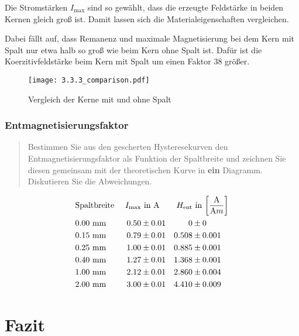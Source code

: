 \documentclass[12pt,a4paper]{scrartcl}
\numberwithin{equation}{section} %
\renewcommand{\[}{} %
\renewcommand{\]}{\noindent} %
\begin{document}
Die Stromstärken \(I_\mathrm{max}\) sind so gewählt, dass die erzeugte
Feldstärke in beiden Kernen gleich groß ist. Damit lassen sich die
Materialeigenschaften vergleichen.

Dabei fällt auf, dass Remanenz und maximale Magnetisierung bei dem Kern
mit Spalt nur etwa halb so groß wie beim Kern ohne Spalt ist. Dafür ist
die Koerzitivfeldstärke beim Kern mit Spalt um einen Faktor \(38\)
größer.

\begin{figure}
\centering
\texttt{[image: 3.3.3\_comparison.pdf]}
\caption{Vergleich der Kerne mit und ohne Spalt}
\end{figure}

\hypertarget{entmagnetisierungsfaktor-1}{%
\subsubsection{Entmagnetisierungsfaktor}\label{entmagnetisierungsfaktor-1}}

\begin{quote}
Bestimmen Sie aus den gescherten Hysteresekurven den
Entmagnetisierungsfaktor als Funktion der Spaltbreite und zeichnen Sie
diesen gemeinsam mit der theoretischen Kurve in \textbf{ein} Diagramm.
Diskutieren Sie die Abweichungen.
\end{quote}

\[
\begin{align*}
    &\text{Spaltbreite } &
        I_\mathrm{max} &\text{ in } \mathrm A &
        H_\mathrm{ent} &\text{ in }
            {\tiny \left[ \frac{\mathrm A}{\mathrm Am} \right] }
        \\
    &0.00 \ \mathrm{mm} &
        0.50 &\pm 0.01 &
        0 &\pm 0
        \\
    &0.15 \ \mathrm{mm} &
        0.79 &\pm 0.01 &
        0.508 &\pm 0.001
        \\
    &0.25 \ \mathrm{mm} &
        1.00 &\pm 0.01 &
        0.885 &\pm 0.001
        \\
    &0.40 \ \mathrm{mm} &
        1.27 &\pm 0.01 &
        1.368 &\pm 0.001
        \\
    &1.00 \ \mathrm{mm} &
        2.12 &\pm 0.01 &
        2.860 &\pm 0.004
        \\
    &2.00 \ \mathrm{mm} &
        3.00 &\pm 0.01 &
        4.410 &\pm 0.009
\end{align*}
\]

\hypertarget{fazit}{%
\section{Fazit}\label{fazit}}
\end{document}
